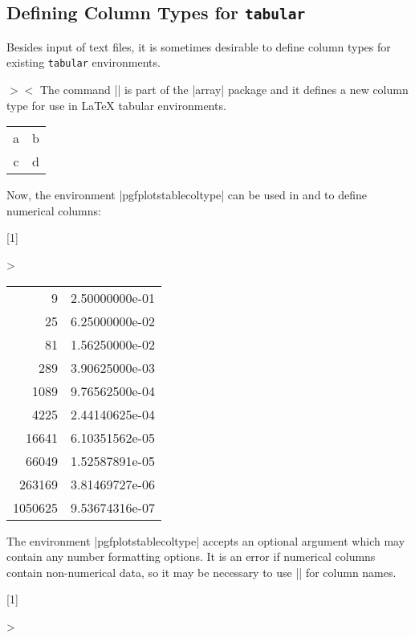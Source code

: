 \documentclass[a4paper]{ltxdoc}
\begin{document}
\subsection{Defining Column Types for \texttt{tabular}}

Besides input of text files, it is sometimes desirable to define column types
for existing \texttt{tabular} environments.

\begin{command}{\newcolumntype{}$>$$<$
}
    The command |\newcolumntype| is part of the |array| package and it defines
    a new column type  for use in \LaTeX{} tabular environments.
\begin{codeexample}
\usepackage{array}
\end{codeexample}

\begin{codeexample}[]
\begin{tabular}{dl}
a & b \\
c & d \\
\end{tabular}
\end{codeexample}

    Now, the environment |pgfplotstablecoltype| can be used in  and  to define numerical columns:
\begin{codeexample}[]
\newcolumntype{L}[1]
    {>{\begin{pgfplotstablecoltype}[#1]}r<{\end{pgfplotstablecoltype}}}

\begin{tabular}{L{int detect}L{sci,sci subscript,sci zerofill}}
9      & 2.50000000e-01\\
25     & 6.25000000e-02\\
81     & 1.56250000e-02\\
289    & 3.90625000e-03\\
1089   & 9.76562500e-04\\
4225   & 2.44140625e-04\\
16641  & 6.10351562e-05\\
66049  & 1.52587891e-05\\
263169 & 3.81469727e-06\\
1050625& 9.53674316e-07\\
\end{tabular}
\end{codeexample}
    \noindent The environment |pgfplotstablecoltype| accepts an optional
    argument which may contain any number formatting options. It is an error if
    numerical columns contain non-numerical data, so it may be necessary to use
    |\multicolumn| for column names.
\begin{codeexample}[]
\newcolumntype{L}[1]
    {>{\begin{pgfplotstablecoltype}[#1]}r<{\end{pgfplotstablecoltype}}}


\end{codeexample}
\end{command}
\end{document}
